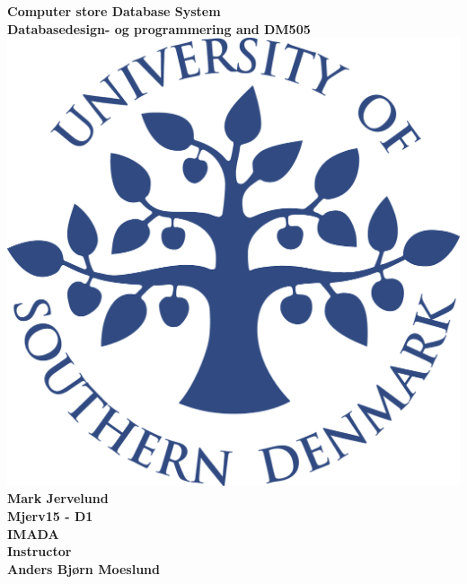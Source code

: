 \documentclass[a4paper,10pt,titlepage]{report}
\date{}
\begin{document}
\begin{titlepage}
\centering
    \vspace*{9\baselineskip}
    \huge
    \bfseries
    Computer store Database System \\
    \normalfont 
	\huge    
    Databasedesign- og programmering and DM505  \\[4\baselineskip]
    \normalfont
	\includegraphics[scale=0.2]{SDU_logo}
    \vfill
    Mark Jervelund \\ Mjerv15 - D1 \\ 
    \vspace{5mm}
    IMADA \\
    \vspace{5mm} Instructor \\ 
    Anders Bjørn Moeslund
    \\ \vspace{5mm}
    \textbf{\datedate} \\[2\baselineskip]
\end{titlepage}

\renewcommand{\thepage}{\roman{page}}%
\tableofcontents

\newpage
\setcounter{page}{1}
\renewcommand{\thepage}{\arabic{page}}
\end{document}
